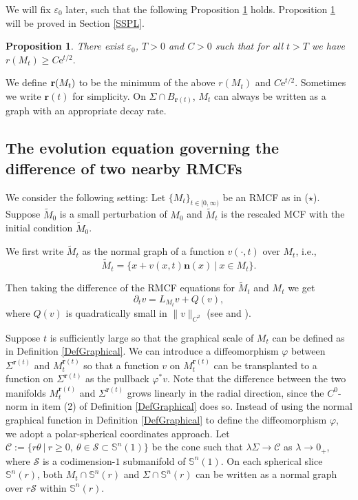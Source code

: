 \documentclass[12pt]{amsart}
\numberwithin{equation}{section}
\newtheorem{proposition}[theorem]{Proposition}
\numberwithin{equation}{section}
\newcommand{\eps}{\varepsilon}
\newcommand{\bn}{\mathbf{n}}
\newcommand{\br}{\mathbf{r}}
\begin{document}
	We will fix $\eps_0$ later, such that the following Proposition \ref{PropPL} holds. Proposition \ref{PropPL} will be proved in Section \ref{SSPL}.
	
	\begin{proposition}\label{PropPL}
		There exist $\eps_0$, $T>0$ and $C>0$ such that for all $t>T$ we have 
		$\mathit r(M_t)\geq C \mathrm{e}^{t/2}. $
	\end{proposition}
	
	We define ${\bf r}(M_t)$ to be the minimum of the above $\mathit r(M_t)$ and $C\mathrm{e}^{t/2}$. Sometimes we write $\mathbf{r}(t)$ for simplicity. On $\Sigma\cap B_ {\br(t)}$, $M_t$ can always be written as a graph with an appropriate decay rate. 
	
	\subsection{The evolution equation governing the difference of two nearby RMCFs}\label{SSDifferenceEq}
	We consider the following setting: Let $\{M_t\}_{t\in[0,\infty)}$ be an RMCF as in ($\star$). Suppose $\widetilde M_0$ is a small perturbation of $M_0$ and $\widetilde M_t$ is the rescaled MCF with the initial condition $\widetilde M_0$. 
	
	
	We first write $\widetilde M_t$ as the normal graph of a function  $v(\cdot,t)$ over $M_t$, i.e., 
	\begin{equation}\label{EqGraphRMCF}\widetilde M_t=\{x+v(x,t)\bn(x)\ |\ x\in M_t\}.\end{equation}
	
	Then taking the difference of the RMCF equations for $\widetilde M_t$ and $M_t$ we get
	\begin{equation}\label{EqDifference2}\partial_t v=L_{M_t}v+ Q(v),\end{equation}
	where $Q(v)$ is quadratically small in $\|v\|_{C^2}$ (see \cite[Lemma 4.3]{CM2} and \cite[Appendix A]{SX}). 
	
	Suppose $t$ is sufficiently large so that the graphical scale of $M_t$ can be defined as in Definition \ref{DefGraphical}. We can introduce a diffeomorphism $\varphi$ between $\Sigma^{\mathbf r(t)}$ and $M_t^{\mathbf r(t)}$ so that a function $v$ on $M_t^{\mathbf r(t)}$ can be transplanted to a function on $\Sigma^{\mathbf r(t)}$ as the pullback $\varphi^* v$. Note that the difference between the two manifolds $M_t^{\mathbf r(t)}$ and $\Sigma^{\mathbf r(t)}$ grows linearly in the radial direction, since the $C^0$-norm in item (2) of Definition \ref{DefGraphical} does so. Instead of using the normal graphical function in Definition \ref{DefGraphical} to define the diffeomorphism $\varphi$, we adopt a polar-spherical coordinates approach. Let $\mathcal C:=\{r\theta\ |\ r\geq0,\ \theta\in \mathcal S\subset \mathbb S^n(1)\}$ be the cone such that $\lambda \Sigma\to \mathcal C$ as $\lambda\to 0_+$, where $\mathcal S$ is a codimension-$1$ submanifold of $\mathbb S^n(1)$. On each spherical slice $\mathbb S^n(r)$, both $M_t\cap \mathbb S^n(r)$ and $\Sigma\cap  \mathbb S^n(r)$ can be written as a normal graph over $r\mathcal S$ within $\mathbb S^n(r)$.
	
\end{document}
